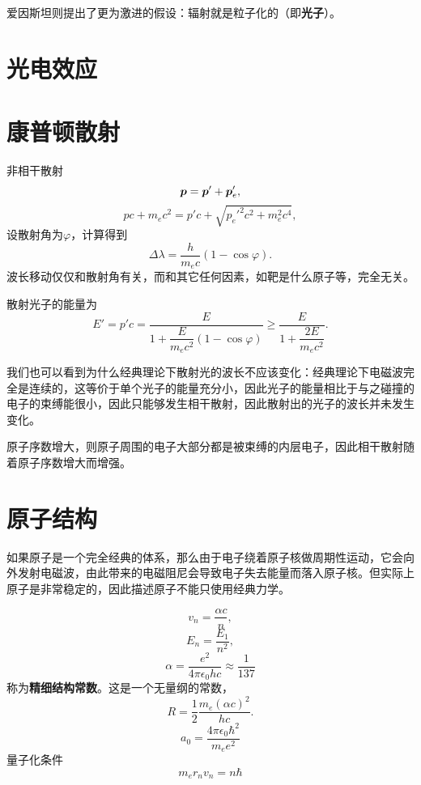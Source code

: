 \documentclass[UTF8, a4paper]{ctexart}
\begin{document}
爱因斯坦则提出了更为激进的假设：辐射就是粒子化的（即\textbf{光子}）。

\section{光电效应}

\section{康普顿散射}

非相干散射
\[
    \vb*{p} = \vb*{p}' + \vb*{p}'_e,
\]
\[
    pc + m_e c^2 = p' c + \sqrt{{p_e'}^2 c^2 + m_e^2 c^4},
\]
设散射角为$\varphi$，计算得到
\begin{equation}
    \Delta \lambda = \frac{h}{m_e c} (1 - \cos \varphi).
\end{equation}
波长移动仅仅和散射角有关，而和其它任何因素，如靶是什么原子等，完全无关。

散射光子的能量为
\begin{equation}
    E' = p'c = \frac{E}{1 + \dfrac{E}{m_e c^2}(1 - \cos \varphi)} \geq \frac{E}{1 + \dfrac{2 E}{m_e c^2}}.
\end{equation}

我们也可以看到为什么经典理论下散射光的波长不应该变化：经典理论下电磁波完全是连续的，这等价于单个光子的能量充分小，因此光子的能量相比于与之碰撞的电子的束缚能很小，因此只能够发生相干散射，因此散射出的光子的波长并未发生变化。

原子序数增大，则原子周围的电子大部分都是被束缚的内层电子，因此相干散射随着原子序数增大而增强。

\section{原子结构}

如果原子是一个完全经典的体系，那么由于电子绕着原子核做周期性运动，它会向外发射电磁波，由此带来的电磁阻尼会导致电子失去能量而落入原子核。但实际上原子是非常稳定的，因此描述原子不能只使用经典力学。

\[
    v_n = \frac{\alpha c}{n},
\]
\[
    E_n = \frac{E_1}{n^2},
\]
\begin{equation}
    \alpha = \frac{e^2}{4\pi \epsilon_0 h c} \approx \frac{1}{137}
\end{equation}
称为\textbf{精细结构常数}。这是一个无量纲的常数，
\[
    R = \frac{1}{2} \frac{m_e (\alpha c)^2}{hc}.
\]
\[
    a_0 = \frac{4\pi\epsilon_0 \hbar^2}{m_e e^2}
\]
量子化条件
\begin{equation}
    m_e r_n v_n = n \hbar
\end{equation}
\end{document}

